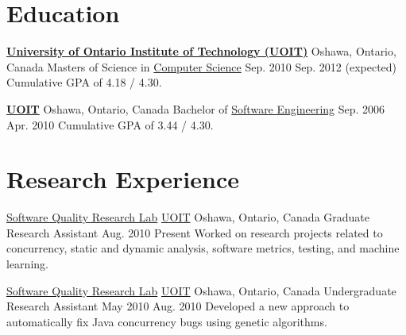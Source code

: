 
  \section{Education}

  \educationEntry
    {\href{http://www.uoit.ca/}{\textbf{University of Ontario Institute of Technology (UOIT)}}}
    {Oshawa, Ontario, Canada}
    {Masters of Science in \href{http://gradstudies.uoit.ca/EN/main/future\_students/masters\_programs/computerscience.html}{Computer Science}}
    {Sep. 2010}
    {Sep. 2012 (expected)}
    {Cumulative GPA of 4.18 / 4.30.}

  \educationEntry
    {\href{http://www.uoit.ca/}{\textbf{UOIT}}}
    {Oshawa, Ontario, Canada}
    {Bachelor of \href{http://engineering.uoit.ca/undergraduate/software/}{Software Engineering}}
    {Sep. 2006}
    {Apr. 2010}
    {Cumulative GPA of 3.44 / 4.30.}

  \section{Research Experience}

  \researchEntry
    {\href{http://sqrlab.ca/}{Software Quality Research Lab}}
    {\href{http://www.uoit.ca/}{UOIT}}
    {Oshawa, Ontario, Canada}
    {Graduate Research Assistant}
    {Aug. 2010}
    {Present}
    {Worked on research projects related to concurrency, static and dynamic analysis, software metrics, testing, and machine learning.}

  \researchEntry
    {\href{http://sqrlab.ca/}{Software Quality Research Lab}}
    {\href{http://www.uoit.ca/}{UOIT}}
    {Oshawa, Ontario, Canada}
    {Undergraduate Research Assistant}
    {May 2010}
    {Aug. 2010}
    {Developed a new approach to automatically fix Java concurrency bugs using genetic algorithms.}

